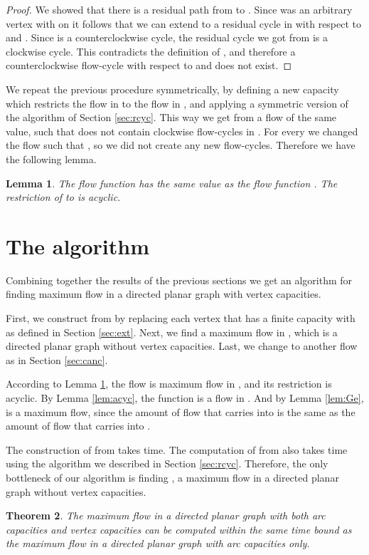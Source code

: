 \documentclass[a4paper,11pt]{article}
\newtheorem{theorem}{Theorem}[section]
\newtheorem{lemma}[theorem]{Lemma}
\begin{document}
\begin{proof}
We showed that there is a residual path from  to .
Since  was an arbitrary vertex with  on  it follows that
we can extend  to a residual cycle in  with respect to  and
. Since  is a counterclockwise cycle, the residual cycle we got from
 is a clockwise cycle.
This contradicts the definition of , and therefore a counterclockwise
flow-cycle  with respect to  and  does not exist.
\end{proof}

We repeat the previous procedure symmetrically, by defining a new capacity
 which restricts the flow in  to the flow in , and applying a
symmetric version of the algorithm of Section \ref{sec:rcyc}. This way we
get from  a flow  of the same value, such that 
does not contain clockwise flow-cycles in . For
every  we changed the flow such that , so we did not create any new flow-cycles.
Therefore we have the following lemma.
\begin{lemma} \label{lem:fpp}
The flow function  has the same value as the flow function . The restriction
 of  to  is acyclic.
\end{lemma}

\section{The algorithm}

Combining together the results of the previous sections we get an
algorithm for finding maximum flow in a directed planar graph with
vertex capacities.

First, we construct  from  by replacing each vertex that has a
finite capacity with  as defined in Section \ref{sec:ext}. Next,
we find a maximum flow  in , which is a directed planar graph
without vertex capacities.  Last, we change
  to another flow  as in Section \ref{sec:canc}.

According to
Lemma \ref{lem:fpp}, the flow  is maximum flow in , and
 its restriction  is acyclic.
 By Lemma \ref{lem:acyc}, the function  is a flow in
 . And by Lemma \ref{lem:Ge},  is a maximum flow, since the amount of
 flow that  carries into  is the same as the amount of
 flow that  carries into .

 The construction of  from  takes  time. The computation
 of  from  also takes  time using the algorithm
we described in Section \ref{sec:rcyc}. Therefore,
 the only bottleneck of our algorithm is finding , a maximum flow
 in a directed planar graph without vertex capacities.

\begin{theorem}
  The maximum flow in a directed planar graph with both arc capacities
  and vertex capacities can be computed within the same time bound as the
  maximum flow in a directed planar graph with  arc capacities only.
\end{theorem}
\end{document}
